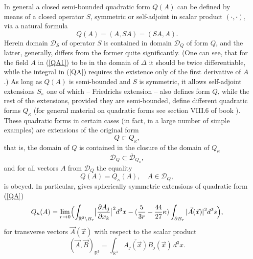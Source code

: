 \documentclass[12pt]{article}
\newcommand{\ol}{\overline}
\newcommand{\DD}{\mathcal{D}}
\newcommand{\RR}{\mathbb{R}}
\begin{document}
    In general a closed semi-bounded quadratic form
$ Q(A) $
    can be defined by means of a closed operator
$ S $,
    symmetric or self-adjoint
    in scalar product
$ (\cdot , \cdot ) $,
	via a natural formula
\begin{equation*}
    Q(A) = (A,SA) = (SA,A).
\end{equation*}
	Herein domain
$ \DD_{S} $
	of operator
$ S $
	is contained in domain
$ \DD_{Q} $
	of form
$ Q $,
	and the latter, generally, differs from the former quite significantly.
(One can see, that for the field
$ A $ in
(\ref{QA1})
    to be in the domain of
$ \Delta $
    it should be twice differentiable, while the integral in
(\ref{QA})
    requires the existence only of the first derivative of
$ A $.)
    As long as
$ Q(A) $ 
    is semi-bounded and
$ S $
    is symmetric,
    it allows self-adjoint extensions
$ S_{\kappa} $
	one of which -- Friedrichs extension
\cite{FStone} --
	also defines form
$ Q $,
	while the rest of the extensions, provided they are semi-bounded,
	define different quadratic forms
$ Q_{\kappa} $
(for general material on quadratic forms see section VIII.6 of book
\cite{RS1}).
	These quadratic forms in certain cases (in fact, in a large number
    of simple examples)
	are extensions of the original form
\begin{equation*}
    Q \subset Q_{\kappa} ,
\end{equation*}
	that is, the domain of 
$ Q $
	is contained in the closure of the domain of 
$ Q_{\kappa} $
\begin{equation*}
    \DD_{Q} \subset \ol{\DD}_{Q_{\kappa}} ,
\end{equation*}
	and for all vectors
$ A $ from
$ \DD_{Q} $
	the equality
\begin{equation*}
    Q(A) = Q_{\kappa}(A) ,\quad A\in \DD_{Q} ,
\end{equation*}
	is obeyed.
	In particular, 
\cite{Inv}
	gives spherically symmetric extensions of quadratic form
(\ref{QA})
\begin{equation}
\label{QkA}
        Q_{\kappa}(A) = \lim_{r\to 0}\Bigl(
    \int_{\RR^{3}\setminus B_{r}}
        \bigl|\frac{\partial A_{j}}{\partial x_{k}}\bigr|^{2} d^{3} x -
    (\frac{5}{3r}+ \frac{44}{27}\kappa) \int_{\partial B_{r}}
        |\vec{A}(\vec{x})|^{2} d^{2} s \Bigr) ,
\end{equation}
	for transverse vectors
$ \vec{A}(\vec{x}) $
	with respect to the scalar product
\begin{equation*}
    (\vec{A},\vec{B})_{\RR^{3}} = \int_{\RR^{3}}
	\ol{A_{j}(\vec{x})} B_{j}(\vec{x}) \,d^{3}x .
\end{equation*}
\end{document}
